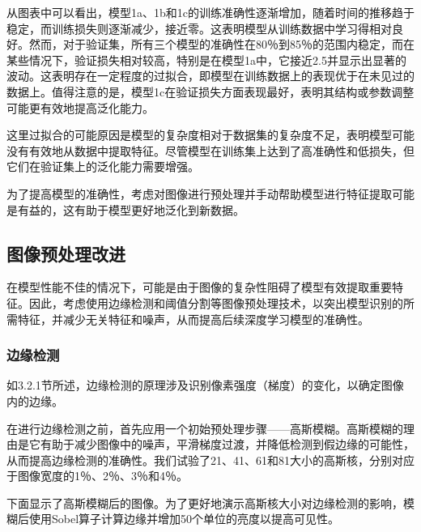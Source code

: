 从图表中可以看出，模型1a、1b和1c的训练准确性逐渐增加，随着时间的推移趋于稳定，而训练损失则逐渐减少，接近零。这表明模型从训练数据中学习得相对良好。然而，对于验证集，所有三个模型的准确性在80％到85％的范围内稳定，而在某些情况下，验证损失相对较高，特别是在模型1a中，它接近2.5并显示出显著的波动。这表明存在一定程度的过拟合，即模型在训练数据上的表现优于在未见过的数据上。值得注意的是，模型1c在验证损失方面表现最好，表明其结构或参数调整可能更有效地提高泛化能力。

这里过拟合的可能原因是模型的复杂度相对于数据集的复杂度不足，表明模型可能没有有效地从数据中提取特征。尽管模型在训练集上达到了高准确性和低损失，但它们在验证集上的泛化能力需要增强。

为了提高模型的准确性，考虑对图像进行预处理并手动帮助模型进行特征提取可能是有益的，这有助于模型更好地泛化到新数据。

\subsection{图像预处理改进}

在模型性能不佳的情况下，可能是由于图像的复杂性阻碍了模型有效提取重要特征。因此，考虑使用边缘检测和阈值分割等图像预处理技术，以突出模型识别的所需特征，并减少无关特征和噪声，从而提高后续深度学习模型的准确性。

\subsubsection{边缘检测}

如3.2.1节所述，边缘检测的原理涉及识别像素强度（梯度）的变化，以确定图像内的边缘。

在进行边缘检测之前，首先应用一个初始预处理步骤——高斯模糊。高斯模糊的理由是它有助于减少图像中的噪声，平滑梯度过渡，并降低检测到假边缘的可能性，从而提高边缘检测的准确性\cite{4.3}。我们试验了21、41、61和81大小的高斯核，分别对应于图像宽度的1％、2％、3％和4％。

下面显示了高斯模糊后的图像。为了更好地演示高斯核大小对边缘检测的影响，模糊后使用Sobel算子计算边缘并增加50个单位的亮度以提高可见性。

